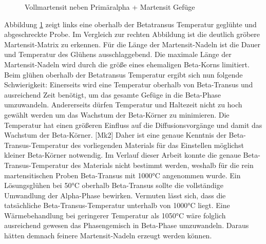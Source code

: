 \documentclass[a4paper, 11pt]{tubsreprt}
\begin{document}
\begin{figure}
\caption{Vollmartensit neben Primäralpha + Martensit Gefüge}
\label{Vollmartensit neben 960}
\end{figure}
Abbildung \ref{Vollmartensit neben 960} zeigt links eine oberhalb der Betatransus Temperatur geglühte und abgeschreckte Probe. Im Vergleich zur rechten Abbildung ist die deutlich gröbere Martensit-Matrix zu erkennen. Für die Länge der Martensit-Nadeln ist die Dauer und Temperatur des Glühens ausschlaggebend. Die maximale Länge der Martensit-Nadeln wird durch die größe eines ehemaligen Beta-Korns limitiert. Beim glühen oberhalb der Betatransus Temperatur ergibt sich nun folgende Schwierigkeit: Einerseits wird eine Temperatur oberhalb von Beta-Transus und ausreichend Zeit benötigt, um das gesamte Gefüge in die Beta-Phase umzuwandeln. Andererseits dürfen Temperatur und Haltezeit nicht zu hoch gewählt werden um das Wachstum der Beta-Körner zu minimieren. Die Temperatur hat einen größeren Einfluss auf die Diffusionsvorgänge und damit das Wachstum der Beta-Körner. [Mk2] Daher ist eine genaue Kenntnis der Beta-Transus-Temperatur des vorliegenden Materials für das Einstellen möglichst kleiner Beta-Körner notwendig.
Im Verlauf dieser Arbeit konnte die genaue Beta-Transus-Temperatur des Materials nicht bestimmt werden, weshalb für die rein martensitischen Proben Beta-Transus mit 1000°C angenommen wurde. Ein Lösungsglühen bei 50°C oberhalb Beta-Transus sollte die vollständige Umwandlung der Alpha-Phase bewirken. Vermuten lässt sich, dass die tatsächliche Beta-Transus-Temperatur unterhalb von 1000°C liegt. Eine Wärmebehandlung bei geringerer Temperatur als 1050°C wäre folglich ausreichend gewesen das Phasengemisch in Beta-Phase umzuwandeln. Daraus hätten demnach feinere Martensit-Nadeln erzeugt werden können. 
\end{document}
